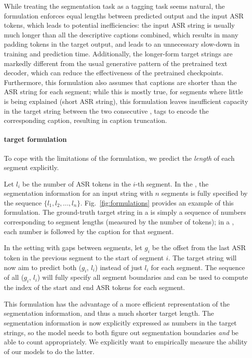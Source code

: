 \documentclass[11pt]{article}
\begin{document}
While treating the segmentation task as a tagging task seems natural,
the \hardencoding formulation enforces equal lengths between predicted output and the input ASR tokens, which leads to potential inefficiencies: 
the input ASR string is usually much longer than all the descriptive captions combined, which results in many padding tokens in the target output, and leads to an unnecessary slow-down in training and prediction time.   
Additionally, the longer-form target strings are markedly different from the usual generative pattern of the pretrained text decoder, which can reduce the effectiveness of the pretrained checkpoints.
Furthermore, this formulation also assumes that captions are shorter than the ASR string for each segment; while this is mostly true, for segments where little is being explained (short ASR string), this formulation leaves insufficient capacity in the target string between the two consecutive \sep{} tags to encode the corresponding caption, resulting in caption truncation.

\paragraph{\Offsetbased target formulation}
To cope with the limitations of the \hardencoding formulation, we predict the {\em length} of each segment explicitly.

Let $l_i$ be the number of ASR tokens in the $i$-th segment.
In the \partitionsetting, the segmentation information for an input string with $n$ segments is fully specified by the sequence $\{l_1, l_2, ..., l_n\}$. 
Fig.~\ref{fig:formulations} provides an example of this \offsetbased formulation.
The ground-truth target string in a \segonly is simply a sequence of numbers corresponding to segment lengths (measured by the number of tokens); in a \segcap, each number is followed by the caption for that segment.

In the \vanilla setting with gaps between segments,
let $g_i$ be the offset from the last ASR token in the previous segment to the start of segment $i$.  
The target string will now aim to predict both ($g_i$, $l_i$) instead of just $l_i$ for each segment.
The sequence of all ($g_i$, $l_i$) will fully specify all segment boundaries and can be used to compute the index of the start and end ASR tokens for each segment.  

This formulation has the advantage of a more efficient representation of the segmentation information, and thus a much shorter target length.
The segmentation information is now explicitly expressed as numbers in the target strings, so the model needs to both figure out segmentation boundaries {\em and} be able to count appropriately.
We explicitly want to empirically measure the ability of our models to do the latter.
\end{document}
